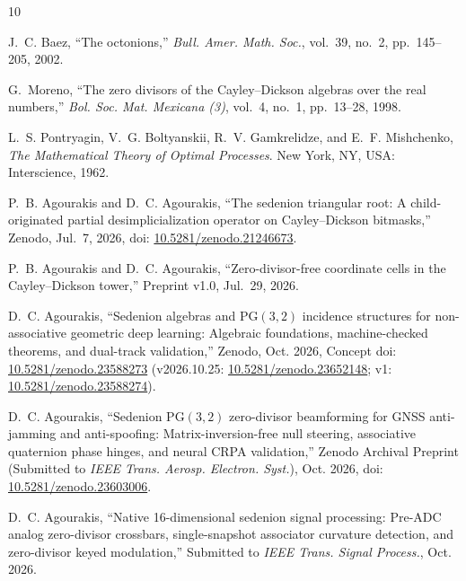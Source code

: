 \documentclass[journal,twoside]{IEEEtran}
\theoremstyle{definition}
\theoremstyle{remark}
\newcommand{\PG}{\mathrm{PG}}
\begin{document}
\begin{thebibliography}{10}

J.~C. Baez, ``The octonions,'' \emph{Bull. Amer. Math. Soc.}, vol.~39, no.~2, pp.~145--205, 2002.

G.~Moreno, ``The zero divisors of the Cayley--Dickson algebras over the real numbers,'' \emph{Bol. Soc. Mat. Mexicana (3)}, vol.~4, no.~1, pp.~13--28, 1998.

L.~S. Pontryagin, V.~G. Boltyanskii, R.~V. Gamkrelidze, and E.~F. Mishchenko, \emph{The Mathematical Theory of Optimal Processes}. New York, NY, USA: Interscience, 1962.

P.~B. Agourakis and D.~C. Agourakis, ``The sedenion triangular root: A child-originated partial desimplicialization operator on Cayley--Dickson bitmasks,'' Zenodo, Jul.~7, 2026, doi: \href{https://doi.org/10.5281/zenodo.21246673}{10.5281/zenodo.21246673}.

P.~B. Agourakis and D.~C. Agourakis, ``Zero-divisor-free coordinate cells in the Cayley--Dickson tower,'' Preprint v1.0, Jul.~29, 2026.

D.~C. Agourakis, ``Sedenion algebras and $\PG(3,2)$ incidence structures for non-associative geometric deep learning: Algebraic foundations, machine-checked theorems, and dual-track validation,'' Zenodo, Oct. 2026, Concept doi: \href{https://doi.org/10.5281/zenodo.23588273}{10.5281/zenodo.23588273} (v2026.10.25: \href{https://doi.org/10.5281/zenodo.23652148}{10.5281/zenodo.23652148}; v1: \href{https://doi.org/10.5281/zenodo.23588274}{10.5281/zenodo.23588274}).

D.~C. Agourakis, ``Sedenion $\PG(3,2)$ zero-divisor beamforming for GNSS anti-jamming and anti-spoofing: Matrix-inversion-free null steering, associative quaternion phase hinges, and neural CRPA validation,'' Zenodo Archival Preprint (Submitted to \emph{IEEE Trans. Aerosp. Electron. Syst.}), Oct. 2026, doi: \href{https://doi.org/10.5281/zenodo.23603006}{10.5281/zenodo.23603006}.

D.~C. Agourakis, ``Native 16-dimensional sedenion signal processing: Pre-ADC analog zero-divisor crossbars, single-snapshot associator curvature detection, and zero-divisor keyed modulation,'' Submitted to \emph{IEEE Trans. Signal Process.}, Oct. 2026.

\end{thebibliography}
\end{document}
